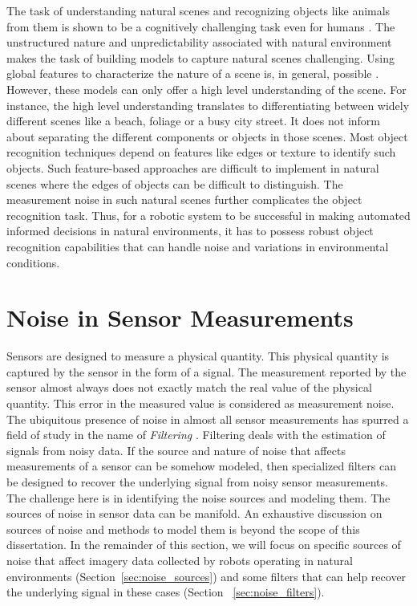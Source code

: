 \documentclass {udthesis}
\begin{document}
The task of understanding natural scenes and recognizing objects like animals from them is shown to be a cognitively challenging task 
even for humans \cite{wichmann}. The unstructured nature and unpredictability associated with natural environment makes the task of 
building models to capture natural scenes challenging.
Using global features to characterize the nature of a scene is, in general, possible \cite{olivia}. However, these models can only offer a high level understanding
of the scene. For instance, the high level understanding translates to differentiating between widely different scenes like a beach, foliage or a busy city street. It does not inform about separating the different components or objects in those scenes. Most object recognition techniques depend on features like edges or texture to identify such objects. Such feature-based approaches are difficult to implement in natural scenes where the edges of objects can be difficult to distinguish.
The measurement noise in such natural scenes further complicates the object recognition task. 
Thus, for a robotic system to be
successful in making automated informed decisions in natural environments, it has to possess robust object recognition capabilities that can handle noise and variations in environmental conditions.


\section{Noise in Sensor Measurements}

Sensors are designed to measure a physical quantity. This physical quantity is captured by the sensor in the form of a signal.
The measurement reported by the sensor almost always does not exactly match the real value of the physical quantity.
This error in the measured value is considered as measurement noise.
The ubiquitous presence of noise in almost all sensor measurements has spurred a field of study in the name of 
\emph{Filtering} \cite{haykin}. Filtering deals with the estimation of signals from noisy data. 
If the source and nature of noise that affects measurements of a sensor can be somehow modeled, then specialized
filters can be designed to recover the underlying signal from noisy sensor measurements.
The challenge here is in identifying the noise sources and modeling them. 
The sources of noise in sensor data can be manifold. An exhaustive discussion on sources of noise and methods to model them
is beyond the scope of this dissertation. In the remainder of this section, we will focus on specific sources of noise that affect 
imagery data collected by robots operating in natural environments (Section~\ref{sec:noise_sources}) and some filters that can 
help recover the underlying signal in these cases (Section ~\ref{sec:noise_filters}).
\end{document}
